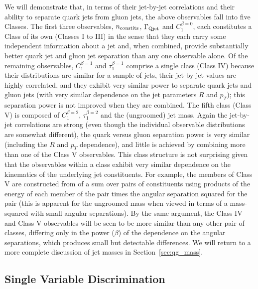 We will demonstrate that, in terms of their jet-by-jet correlations and their ability to separate quark jets from gluon jets, 
the above observables fall into five Classes.  The first three observables, $n_{\rm constits}$, 
$\Gamma_{\rm Qjet}$ and $C_1^{\beta=0}$, each constitutes a Class of its own  (Classes I to III) in the sense that they each carry some independent information 
about a jet and, when combined, provide substantially better quark jet and gluon jet separation than any one observable alone.  Of the remaining
observables, $C_1^{\beta=1}$ and $\tau_1^{\beta=1}$ comprise a single class (Class IV) because their distributions are  similar 
for a sample of jets, their jet-by-jet values are highly correlated, and they exhibit very similar power to separate 
quark jets and gluon jets (with very similar dependence on the jet parameters $R$ and $p_T$); this separation power is not improved
when they are combined.  The fifth class (Class V) is composed of $C_1^{\beta=2}$, $\tau_1^{\beta=2}$ and the (ungroomed) jet mass.  Again the 
jet-by-jet correlations are strong (even though the individual observable distributions are somewhat different), the quark versus gluon separation power is very similar
(including the $R$ and $p_T$ dependence), and little is achieved by combining more than one of the Class V observables.  This class structure is
not surprising given that the observables within a class exhibit very similar dependence on the kinematics of the underlying jet constituents.
For example, the members of Class V are constructed from of a sum over pairs of constituents using products of the energy of each member 
of the pair times the angular separation squared for the pair (this is apparent for the ungroomed mass when viewed in terms of a mass-squared with small angular separations).  
By the same argument, the Class IV and Class V observables will be seen to be more similar than any other pair of classes, differing only in the
power ($\beta$) of the dependence on the angular separations, which  produces small but detectable differences.  
We will return to
 a more complete discussion of jet masses in Section~\ref{sec:qg_mass}.


\subsection{Single Variable Discrimination}



